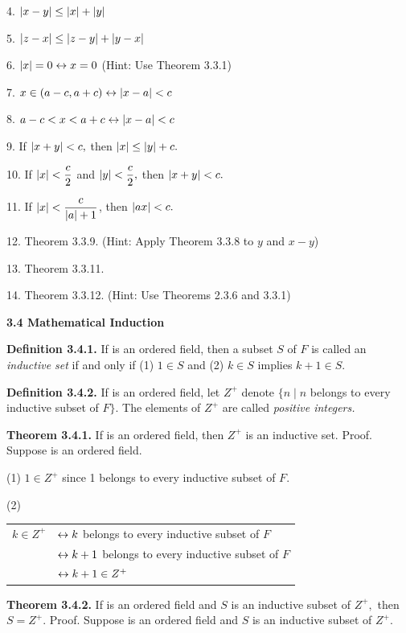 \begin{large}
4. $ \left|x - y\right| \leq \left|x\right| + \left|y\right|$ \nl

5. $\left|z - x\right| \leq \left|z - y\right| + \left|y - x\right|$\nl

6. $\left|x\right|= 0 \leftrightarrow x=0$ (Hint: Use Theorem 3.3.1)\nl

7. $x \in (a - c, a + c) \leftrightarrow  \left|x - a\right| < c $\nl

8. $a-c < x < a + c \leftrightarrow \left|x - a\right| < c $\nl

9. If $\left| x + y\right| < c,$ then $\left|x\right| \leq \left|y\right| + c.$\nl

10. If $\left|x\right| < \dfrac{c}{2}$ and $\left|y\right| < \dfrac{c}{2},$ then $\left|x + y\right| < c.$\nl

11. If $\left|x\right| < \dfrac{c}{\left|a\right| + 1}$, then $\left|ax\right| < c.$\nl

12. Theorem 3.3.9. (Hint: Apply Theorem 3.3.8 to $y$ and $x -y$)

13. Theorem 3.3.11.

14. Theorem 3.3.12. (Hint: Use Theorems 2.3.6 and 3.3.1)

\newpage

\textbf{3.4 Mathematical Induction}\nl

\textbf{Definition 3.4.1.} If \of  is an ordered field, then a subset $S$ of $F$ is called an \textit{inductive set} if and only if (1) $1\in S$ and (2) $k\in S$ implies $k+1\in S.$\nl

\textbf{Definition 3.4.2.} If \of  is an ordered field, let $Z^{+}$ denote $\{n \mid n$ belongs to every inductive subset of $F \}$. The elements of  $Z^{+}$ are called \textit{positive integers.} \nl

\textbf{Theorem 3.4.1.} If \of  is an ordered field, then $Z^{+}$ is an inductive set.\nl
Proof. Suppose \of is an ordered field. \nl

(1) $1\in Z^{+}$ since 1 belongs to every inductive subset of $F.$\nl

(2)\begin{tabular}{r l} 	
$k\in Z^{+}$ &$\leftrightarrow k$ belongs to every inductive subset of $F$\\
&$\leftrightarrow k+1$ belongs to every inductive subset of $F$ \\
&$\leftrightarrow k+1\in Z^{+} $\\
\end{tabular}\nl

\textbf{Theorem 3.4.2.} If \of is an ordered field and $S$ is an inductive subset of $Z^{+},$ then $S =Z^{+}.$\nl 
Proof. Suppose \of is an ordered field and $S$ is an inductive subset of $Z^{+}.$


\end{large}
